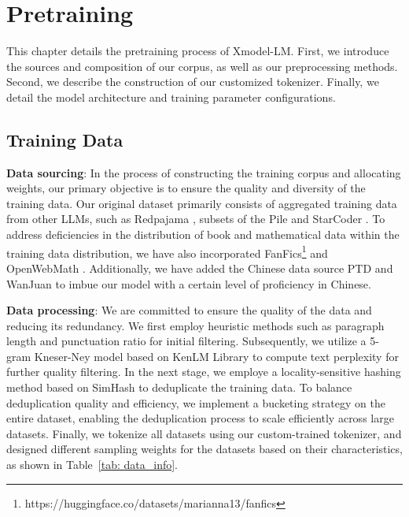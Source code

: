 \documentclass{article}
\newcommand{\llm}{Xmodel-LM\xspace}
\begin{document}
\section{Pretraining}
This chapter details the pretraining process of \llm. First, we introduce the sources and composition of our corpus, as well as our preprocessing methods. Second, we describe the construction of our customized tokenizer. Finally, we detail the model architecture and training parameter configurations.

\subsection{Training Data}

\textbf{Data sourcing}: In the process of constructing the training corpus and allocating weights, our primary objective is to ensure the quality and diversity of the training data. Our original dataset primarily consists of aggregated training data from other LLMs, such as Redpajama \citep{together2023redpajama}, subsets of the Pile \citep{gao2020pile} and StarCoder \citep{li2023starcoder}. To address deficiencies in the distribution of book and mathematical data within the training data distribution, we have also incorporated FanFics\footnote{https://huggingface.co/datasets/marianna13/fanfics} and OpenWebMath \citep{paster2023openwebmath}. Additionally, we have added the Chinese data source PTD \citep{wang2024telechat} and WanJuan \citep{he2023wanjuan} to imbue our model with a certain level of proficiency in Chinese.

\textbf{Data processing}: We are committed to ensure the quality of the data and reducing its redundancy. We first employ heuristic methods such as paragraph length and punctuation ratio for initial filtering. Subsequently, we utilize a 5-gram Kneser-Ney model based on KenLM Library \citep{heafield-2011-kenlm} to compute text perplexity for further quality filtering. In the next stage, we employe a locality-sensitive hashing method based on SimHash to deduplicate the training data. To balance deduplication quality and efficiency, we implement a bucketing strategy on the entire dataset, enabling the deduplication process to scale efficiently across large datasets. Finally, we tokenize all datasets using our custom-trained tokenizer, and designed different sampling weights for the datasets based on their characteristics, as shown in Table~\ref{tab: data_info}.
\end{document}
